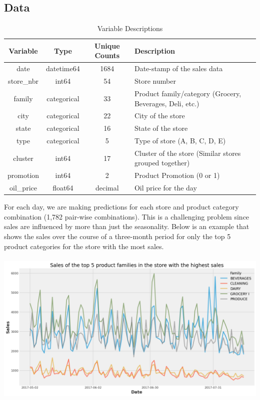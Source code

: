 \documentclass[12pt]{article}
\begin{document}
\subsection{Data}
\begin{table}[H]
\centering
\begin{tabular}{|c|c|c|p{7cm}|}
\hline
\textbf{Variable} & \textbf{Type} & \textbf{Unique Counts} & \textbf{Description} \\ \hline
date & datetime64 & 1684 & Date-stamp of the sales data \\ \hline
store\_nbr & int64 & 54 & Store number \\ \hline
family & categorical & 33 & Product family/category (Grocery, Beverages, Deli, etc.) \\ \hline
city & categorical & 22 & City of the store \\ \hline
state & categorical & 16 & State of the store \\ \hline
type & categorical & 5 & Type of store (A, B, C, D, E) \\ \hline
cluster & int64 & 17 & Cluster of the store (Similar stores grouped together) \\ \hline
promotion & int64 & 2 & Product Promotion (0 or 1) \\ \hline
oil\_price & float64 & decimal & Oil price for the day \\ \hline
\end{tabular}
\caption{Variable Descriptions}
\end{table}
For each day, we are making predictions for each store and product category combination (1,782 pair-wise combinations).
This is a challenging problem since sales are influenced by more than just the seasonality.
Below is an example that shows the sales over the course of a three-month period for only the top 5 product categories for the store with the most sales.
\\
\\
\includegraphics[width=\textwidth]{figures/Top 5 Products.png}
\end{document}
